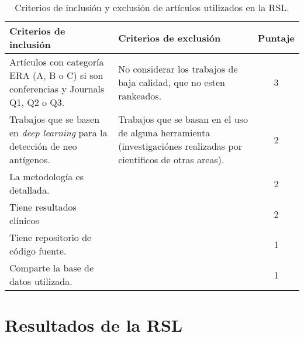 \begin{table}[H]
	\begin{center}
		\caption{Criterios de inclusión y exclusión de artículos utilizados en la RSL.}
		\label{tab:criterios}
		\setlength{\tabcolsep}{0.5em} %
		{\renewcommand{\arraystretch}{1.2}%
			\begin{tabular}{p{5.5cm}p{5.5cm}c}
				\textbf{Criterios de inclusión}                                                   & \textbf{Criterios de exclusión}                                                          & \textbf{Puntaje} \\ \hline
				Artículos con categoría ERA (A, B o C) si son conferencias y Journals Q1, Q2 o Q3. & No considerar los trabajos de baja calidad, que no esten rankeados.                       & 3                \\
				Trabajos que se basen en \textit{deep learning} para la detección de neo antígenos.          & Trabajos que se basan en el uso de alguna herramienta (investigaciónes realizadas por cientificos de otras areas). & 2                \\
				La metodología es detallada.                                                       &                                                                                          & 2                \\
				Tiene resultados clínicos                                                         &                                                                                          & 2                \\
				Tiene repositorio de código fuente.                                          &                                                                                          & 1                \\
				Comparte la base de datos utilizada.                                         &                                                                                          & 1               
			\end{tabular}
		}
	\end{center}
\end{table}





\section{Resultados de la RSL}\index{} 
\label{sec:neoantigen}


